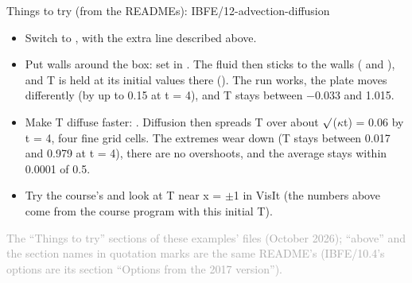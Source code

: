 \documentclass[aspectratio=169,11pt]{beamer}
\newcommand{\sourcecredit}[1]{\vfill\begin{flushright}\tiny\textcolor{DarkGray}{#1}\end{flushright}}
\begin{document}
\begin{frame}{Things to try (from the READMEs): IBFE/12-advection-diffusion}
\scriptsize\setlength{\leftmargini}{5em}
\begin{itemize}\setlength{\itemsep}{1pt}
  \item[IBFE/12.1] Switch to , with the extra line described above.
  \item[IBFE/12.2] Put walls around the box: set  in . The fluid then sticks to the walls ( and ), and T is held at its initial values there (). The run works, the plate moves differently (by up to 0.15 at t = 4), and T stays between $-$0.033 and 1.015.
  \item[IBFE/12.3] Make T diffuse faster: . Diffusion then spreads T over about $\surd$($\kappa$t) = 0.06 by t = 4, four fine grid cells. The extremes wear down (T stays between 0.017 and 0.979 at t = 4), there are no overshoots, and the average stays within 0.0001 of 0.5.
  \item[IBFE/12.4] Try the course's  and look at T near x = $\pm$1 in VisIt (the numbers above come from the course program with this initial T).
\end{itemize}
\sourcecredit{The ``Things to try'' sections of these examples' \code{README.md} files (October 2026); ``above'' and the section names in quotation marks are the same README's (IBFE/10.4's options are its section ``Options from the 2017 version'').}
\end{frame}
\end{document}
